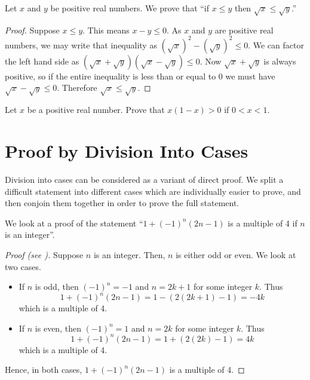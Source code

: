 \begin{example}
    Let $x$ and $y$ be positive real numbers. We prove that ``if $x \leq y$ then $\sqrt x \leq \sqrt y$.''
    \begin{proof}
        Suppose $x \leq y$. This means $x - y \leq 0$. As $x$ and $y$ are positive real numbers, we may write that inequality as $(\sqrt x)^2 - (\sqrt y)^2 \leq 0$. We can factor the left hand side as $(\sqrt x + \sqrt y)(\sqrt x - \sqrt y) \leq 0$. Now $\sqrt x + \sqrt y$ is always positive, so if the entire inequality is less than or equal to 0 we must have $\sqrt x - \sqrt y \leq 0$. Therefore $\sqrt x \leq \sqrt y$.
    \end{proof}
\end{example}

\begin{exercise}
    Let $x$ be a positive real number. Prove that $x(1-x) > 0$ if $0 < x < 1$.
\end{exercise}

\section{Proof by Division Into Cases}
Division into cases can be considered as a variant of direct proof. We split a difficult statement into different cases which are individually easier to prove, and then conjoin them together in order to prove the full statement.

\begin{example}
    We look at a proof of the statement ``$1 + (-1)^n(2n-1)$ is a multiple of 4 if $n$ is an integer''.
    \begin{proof}[Proof (see {\cite[p.~124]{hammack_2018}})]
        Suppose $n$ is an integer. Then, $n$ is either odd or even. We look at two cases.
        \begin{itemize}
            \item If $n$ is odd, then $(-1)^n = -1$ and $n = 2k+1$ for some integer $k$. Thus
            \[
                1 + (-1)^n(2n-1) = 1 - (2(2k+1)-1) = -4k
            \]
            which is a multiple of 4.
            \item If $n$ is even, then $(-1)^n = 1$ and $n = 2k$ for some integer $k$. Thus
            \[
                1 + (-1)^n(2n-1) = 1 + (2(2k)-1) = 4k
            \]
            which is a multiple of 4.
        \end{itemize}
        Hence, in both cases, $1 + (-1)^n(2n-1)$ is a multiple of 4.
    \end{proof}
\end{example}


